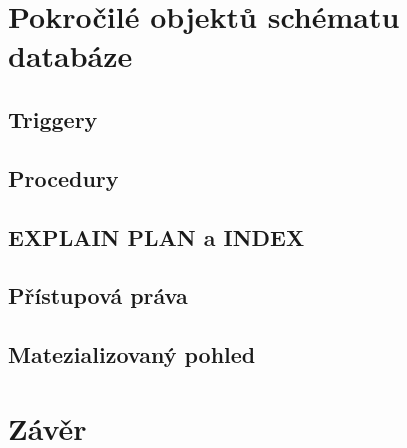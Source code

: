 \documentclass[11pt,a4paper]{article}
\begin{document}
\section{Pokročilé objektů schématu databáze}
    \subsection{Triggery}
    \subsection{Procedury}
    \subsection{EXPLAIN PLAN a INDEX}
    \subsection{Přístupová práva}
    \subsection{Matezializovaný pohled}

\section{Závěr}
\end{document}
